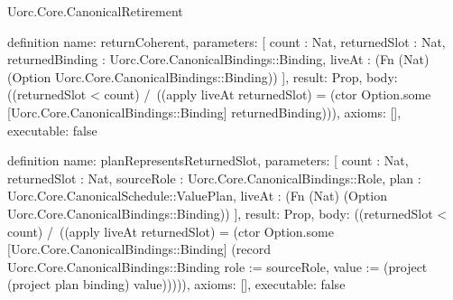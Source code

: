 \begin{lexlean}{Uorc.Core.CanonicalRetirement}
\begin{semanticmodule}
definition{
  name: returnCoherent,
  parameters: [
    count : Nat,
    returnedSlot : Nat,
    returnedBinding : Uorc.Core.CanonicalBindings::Binding,
    liveAt : (Fn (Nat) (Option Uorc.Core.CanonicalBindings::Binding))
  ],
  result: Prop,
  body: ((returnedSlot < count) /\ ((apply liveAt returnedSlot) = (ctor Option.some [Uorc.Core.CanonicalBindings::Binding] returnedBinding))),
  axioms: [],
  executable: false
}

definition{
  name: planRepresentsReturnedSlot,
  parameters: [
    count : Nat,
    returnedSlot : Nat,
    sourceRole : Uorc.Core.CanonicalBindings::Role,
    plan : Uorc.Core.CanonicalSchedule::ValuePlan,
    liveAt : (Fn (Nat) (Option Uorc.Core.CanonicalBindings::Binding))
  ],
  result: Prop,
  body: ((returnedSlot < count) /\ ((apply liveAt returnedSlot) = (ctor Option.some [Uorc.Core.CanonicalBindings::Binding] (record Uorc.Core.CanonicalBindings::Binding {role := sourceRole, value := (project (project plan binding) value)})))),
  axioms: [],
  executable: false
}
\end{semanticmodule}
\end{lexlean}
